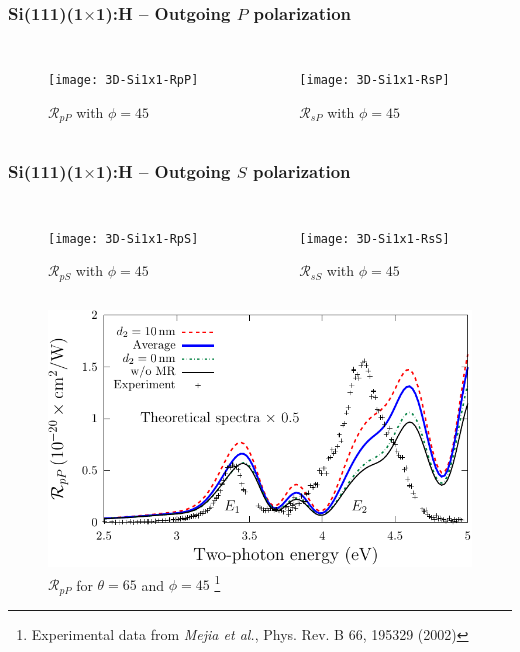 \documentclass{beamer}
\begin{document}
\begin{frame}
\frametitle{Si(111)(1\texorpdfstring{$\times$}{x}1):H -- Outgoing
\texorpdfstring{$P$}{P} polarization}
\begin{columns}
\begin{figure}
\centering
\texttt{[image: 3D-Si1x1-RpP]}
\caption{$\mathcal{R}_{pP}$ with $\phi=45$}
\end{figure}
\begin{figure}
\centering
\texttt{[image: 3D-Si1x1-RsP]}
\caption{$\mathcal{R}_{sP}$ with $\phi=45$}
\end{figure}
\end{columns}
\end{frame}

\begin{frame}
\frametitle{Si(111)(1\texorpdfstring{$\times$}{x}1):H -- Outgoing
\texorpdfstring{$S$}{S} polarization}
\begin{columns}
\begin{figure}
\centering
\texttt{[image: 3D-Si1x1-RpS]}
\caption{$\mathcal{R}_{pS}$ with $\phi=45$}
\end{figure}
\begin{figure}
\centering
\texttt{[image: 3D-Si1x1-RsS]}
\caption{$\mathcal{R}_{sS}$ with $\phi=45$}
\end{figure}
\end{columns}
\end{frame}

\begin{frame}
\begin{figure}
\centering
\includegraphics[width=\textwidth]{fig-Si1x1-MRdepth}
\caption{$\mathcal{R}_{pP}$ for $\theta=65$ and $\phi=45$
\footnote{Experimental data from \emph{Mejia et al.}, Phys. Rev. B 66, 195329 (2002)}}
\end{figure}
\end{frame}
\end{document}
